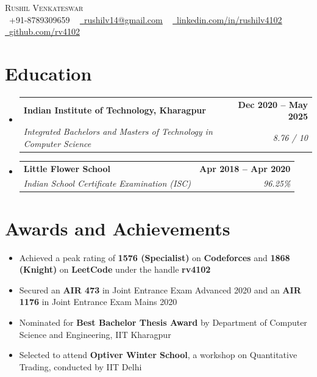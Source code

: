\documentclass[letterpaper]{article}
\makeatletter
\newcommand{\resumeEducation}[4]{
  \item
    \begin{tabular*}{1.0\textwidth}[t]{l@{\extracolsep{\fill}}r}
      \textbf{#1} & \textbf{\small #2} \\
      \textit{\small#3} & \textit{\small #4} \\
    \end{tabular*}
    \vspace{-5pt}
}
\newcommand{\resumeItem}[1]{
  \item 
    \small{{#1 \vspace{-2pt}}}
}
\newcommand{\resumeSubHeadingListStart}{
  \begin{itemize}[leftmargin=0.0in, label={}]
}
\newcommand{\resumeSubHeadingListEnd}{
  \end{itemize}
  \vspace{-10pt}
}
\newcommand{\resumeItemListStart}{
  \begin{itemize}[leftmargin=0.2in]
}
\newcommand{\resumeItemListEnd}{
  \end{itemize}
}
\makeatother
\begin{document}

\begin{center}
  {\Huge \scshape Rushil Venkateswar} \\ 
  \vspace{2pt}
  \small \raisebox{-0.1\height}\faPhone\ +91-8789309659 
  ~ 
  \href{mailto:x=rushilv14@gmail.com}{\raisebox{-0.2\height}\faEnvelope\  \underline{rushilv14@gmail.com}} 
  ~ 
  \href{https://www.linkedin.com/in/rushilv4102/}{\raisebox{-0.2\height}\faLinkedin\ \underline{linkedin.com/in/rushilv4102}}  
  ~
  \href{https://github.com/rv4102}{\raisebox{-0.2\height}\faGithub\ \underline{github.com/rv4102}}
\end{center}
\vspace{-10pt}


\section{Education}
\resumeSubHeadingListStart
\itemsep0em 
  \resumeEducation
    {Indian Institute of Technology, Kharagpur}
    {Dec 2020 -- May 2025}
    {Integrated Bachelors and Masters of Technology in Computer Science}
    {8.76 / 10}
  
  \resumeEducation
    {Little Flower School}
    {Apr 2018 -- Apr 2020}
    {Indian School Certificate Examination (ISC)}
    {96.25\%}
\resumeSubHeadingListEnd

\section{Awards and Achievements}
\resumeItemListStart
\itemsep0em 
  \resumeItem{Achieved a peak rating of \textbf{1576 (Specialist)} on \textbf{Codeforces} and \textbf{1868 (Knight)} on \textbf{LeetCode} under the handle \textbf{rv4102}}
  \resumeItem{Secured an \textbf{AIR 473} in Joint Entrance Exam Advanced 2020 and an \textbf{AIR 1176} in Joint Entrance Exam Mains 2020}
  \resumeItem{Nominated for \textbf{Best Bachelor Thesis Award} by Department of Computer Science and Engineering, IIT Kharagpur}
  \resumeItem{Selected to attend \textbf{Optiver Winter School}, a workshop on Quantitative Trading, conducted by IIT Delhi}
\resumeItemListEnd
\vspace{-12pt}
  
\end{document}

